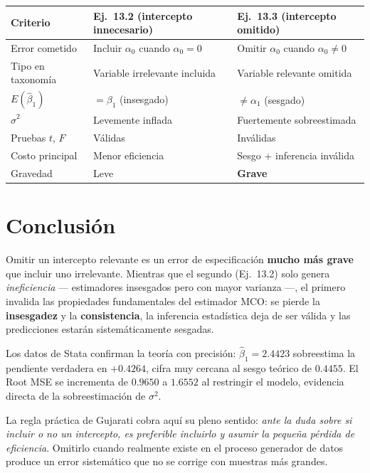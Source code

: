 \documentclass[12pt, letterpaper]{article}
\begin{document}
\begin{center}
\renewcommand{\arraystretch}{1.4}
\small
\begin{tabular}{p{3.8cm}p{3.8cm}p{3.8cm}}
\toprule
\textbf{Criterio}
  & \textbf{Ej.~13.2} \newline (intercepto innecesario)
  & \textbf{Ej.~13.3} \newline (intercepto omitido) \\
\midrule
Error cometido        & Incluir $\alpha_0$ cuando $\alpha_0 = 0$ & Omitir $\alpha_0$ cuando $\alpha_0 \neq 0$ \\
Tipo en taxonomía     & Variable irrelevante incluida            & Variable relevante omitida \\
$E(\hat{\beta}_1)$    & $= \beta_1$ (insesgado)                  & $\neq \alpha_1$ (sesgado) \\
$\hat{\sigma}^2$      & Levemente inflada                        & Fuertemente sobreestimada \\
Pruebas $t$, $F$      & Válidas                                  & Inválidas \\
Costo principal       & Menor eficiencia                         & Sesgo + inferencia inválida \\
Gravedad              & Leve                                     & \textbf{Grave} \\
\bottomrule
\end{tabular}
\end{center}

\section{Conclusión}

\begin{clave}
  Omitir un intercepto relevante es un error de especificación
  \textbf{mucho más grave} que incluir uno irrelevante. Mientras que el
  segundo (Ej.~13.2) solo genera \textit{ineficiencia} --- estimadores
  insesgados pero con mayor varianza ---, el primero invalida las
  propiedades fundamentales del estimador MCO: se pierde la
  \textbf{insesgadez} y la \textbf{consistencia}, la inferencia estadística
  deja de ser válida y las predicciones estarán sistemáticamente sesgadas.

  Los datos de Stata confirman la teoría con precisión:
  $\hat{\beta}_1 = 2.4423$ sobreestima la pendiente verdadera en
  $+0.4264$, cifra muy cercana al sesgo teórico de $0.4455$. El Root MSE
  se incrementa de $0.9650$ a $1.6552$ al restringir el modelo, evidencia
  directa de la sobreestimación de $\sigma^2$.

  La regla práctica de Gujarati cobra aquí su pleno sentido: \textit{ante la
  duda sobre si incluir o no un intercepto, es preferible incluirlo y
  asumir la pequeña pérdida de eficiencia}. Omitirlo cuando realmente
  existe en el proceso generador de datos produce un error sistemático que
  no se corrige con muestras más grandes.
\end{clave}
\end{document}

